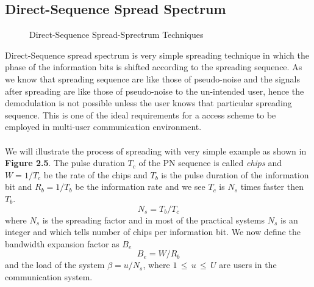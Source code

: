 \subsection{Direct-Sequence Spread Spectrum}
\begin{figure}[htb]
  \centerline{  }
  \caption{Direct-Sequence Spread-Sprectrum Techniques}
\end{figure}
Direct-Sequence spread spectrum is very simple spreading technique in which the phase of the information bits is shifted according to the spreading sequence. As we know that spreading sequence are like those of pseudo-noise and the signals after spreading are like those of pseudo-noise to the un-intended user, hence the demodulation is not possible unless the user knows that particular spreading sequence. This is one of the ideal requirements for a access scheme to be employed in multi-user communication environment. \\ \\
We will illustrate the process of spreading with very simple example as shown in \textbf{Figure 2.5}. The pulse duration $T_c$ of the PN sequence is called \textit{chips} and $W=1/T_c$ be the rate of the chips and $T_b$ is the pulse duration of the information bit and $R_b=1/T_b$ be the information rate and we see $T_c$ is $N_s$ times faster then $T_b$.
\begin{equation}
N_s=T_b/T_c
\end{equation}
where $N_s$ is the spreading factor and in most of the practical systems $N_s$ is an integer and which tells number of chips per information bit. We now define the bandwidth expansion factor as $B_e$
\begin{equation}
B_e=W/R_b
\end{equation}
and the load of the system $\beta=u/N_s$, where $1\,\leq\, u\, \leq\, U$ are users in the communication system.
